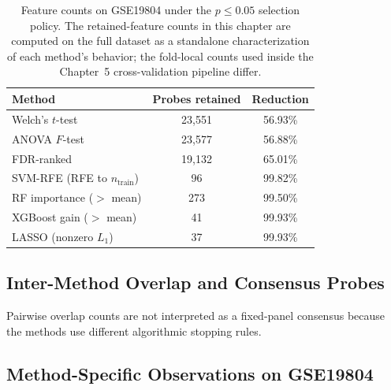 \begin{table}[H]
\centering
\caption{Feature counts on GSE19804 under the $p \leq 0.05$ selection policy. The retained-feature counts in this chapter are computed on the full dataset as a standalone characterization of each method's behavior; the fold-local counts used inside the Chapter~5 cross-validation pipeline differ.}
\label{tab:gse19804_probes}
\small
\begin{tabular}{lcc}
\toprule
\textbf{Method} & \textbf{Probes retained} & \textbf{Reduction} \\
\midrule
Welch's $t$-test & 23,551 & 56.93\% \\
ANOVA $F$-test & 23,577 & 56.88\% \\
FDR-ranked & 19,132 & 65.01\% \\
SVM-RFE (RFE to $n_{\mathrm{train}}$) & 96 & 99.82\% \\
RF importance ($>$ mean) & 273 & 99.50\% \\
XGBoost gain ($>$ mean) & 41 & 99.93\% \\
LASSO (nonzero $L_1$) & 37 & 99.93\% \\
\bottomrule
\end{tabular}
\end{table}

\subsection{Inter-Method Overlap and Consensus Probes}

Pairwise overlap counts are not interpreted as a fixed-panel consensus because the methods use different algorithmic stopping rules.

\subsection{Method-Specific Observations on GSE19804}

